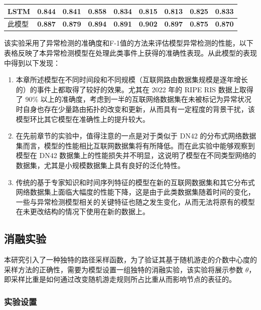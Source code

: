 \begin{table}
\begin{tabular}{lcccccccc}
        \quad LSTM      & 0.844                           & 0.841                           & 0.858                           & 0.834                         & 0.815          & 0.813          & 0.825          & 0.833          \\
        \midrule
        此模型             & \textbf{0.887}                  & \textbf{0.879}                  & \textbf{0.894}                  & \textbf{0.891}                & \textbf{0.902} & \textbf{0.897} & \textbf{0.875} & \textbf{0.870} \\
        \bottomrule
    \end{tabular}
    \label{c5_s2tab}
\end{table}

该实验采用了异常检测的准确度和F-1值的方法来评估模型异常检测的性能，以下表格反映了本异常检测模型在处理此类事件上获得的准确性表现。从此模型的表现中得到以下发现：

\begin{enumerate}
    \item 本章所述模型在不同时间段和不同规模（互联网路由数据集规模是逐年增长的）的事件上都取得了较好的效果。尤其在 2022 年的 RIPE RIS 数据上取得了 90\% 以上的准确度，考虑到一半的互联网络数据集在未被标记为异常状况时自身也存在少量路由拓扑的改变和更新，从而具有一定程度的背景干扰，该模型环比其它模型在准确性上的提升较大。
    \item 在先前章节的实验中，值得注意的一点是对于类似于 DN42 的分布式网络数据集而言，模型的性能相比互联网数据集将有所降低。而在此实验中能够观察到模型在 DN42 数据集上的性能损失并不明显，这说明了模型在不同类型网络的数据集，尤其是小规模数据集上具有良好的泛化特性。
    \item 传统的基于专家知识和时间序列特征的模型在新的互联网数据集和其它分布式网络数据集上面临大幅度的性能下降，这是由于此类数据集随着时间的变化，一些与异常检测模型相关的关键特征也随之发生变化，从而无法将原有的模型在未更改结构的情况下使用在新的数据上。
\end{enumerate}

\subsection{消融实验}

本研究引入了一种独特的路径采样函数，为了验证其基于随机游走的介数中心度的采样方法的正确性，需要为模型设置一组独特的消融实验，该实验将展示参数 $\theta$，即采样比重是如何通过改变随机游走规则所占比重从而影响节点的表征的。

\subsubsection{实验设置}

